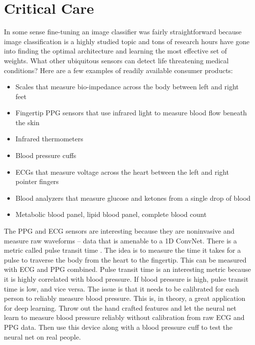 \section{Critical Care}

In some sense fine-tuning an image classifier was fairly straightforward because image classification is a highly studied topic and tons of research hours have gone into finding the optimal architecture and learning the most effective set of weights.  What other ubiquitous sensors can detect life threatening medical conditions? Here are a few examples of readily available consumer products:

\begin{itemize}
    \item Scales that measure bio-impedance across the body between left and right feet
    \item Fingertip PPG sensors that use infrared light to measure blood flow beneath the skin
    \item Infrared thermometers
    \item Blood pressure cuffs
    \item ECGs that measure voltage across the heart between the left and right pointer fingers
    \item Blood analyzers that measure glucose and ketones from a single drop of blood
    \item Metabolic blood panel, lipid blood panel, complete blood count
\end{itemize}

The PPG and ECG sensors are interesting because they are noninvasive and measure raw waveforms -- data that is amenable to a 1D ConvNet.  There is a metric called pulse transit time \cite{geddes1981pulse}.  The idea is to measure the time it takes for a pulse to traverse the body from the heart to the fingertip.  This can be measured with ECG and PPG combined.  Pulse transit time is an interesting metric because it is highly correlated with blood pressure.  If blood pressure is high, pulse transit time is low, and vice versa.  The issue is that it needs to be calibrated for each person to reliably measure blood pressure.  This is, in theory, a great application for deep learning.  Throw out the hand crafted features and let the neural net learn to measure blood pressure reliably without calibration from raw ECG and PPG data.  Then use this device along with a blood pressure cuff to test the neural net on real people.

